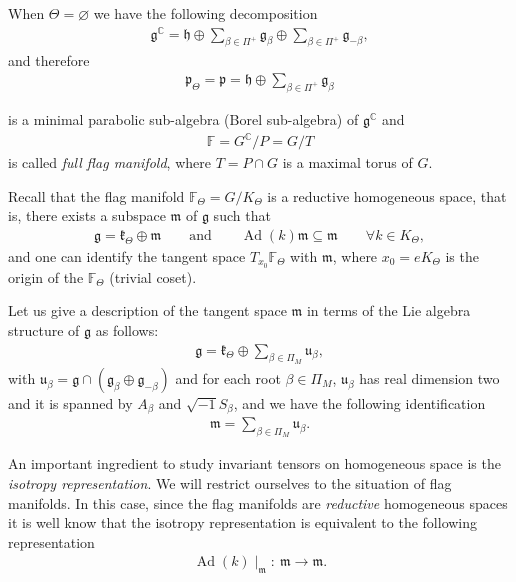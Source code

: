 \documentclass[10pt,a4paper]{amsart}
\numberwithin{equation}{section}
\DeclareMathOperator{\Ad}{Ad}
\begin{document}
When $\Theta=\varnothing$ we have the following decomposition
\begin{gather*}
\mathfrak{g}^\mathbb{C}=\mathfrak{h}\oplus
\sum_{\beta\in \Pi^{+}}\mathfrak{g}_{\beta}\oplus
\sum_{\beta\in \Pi^{+}}\mathfrak{g}_{-\beta},
\end{gather*}
and therefore
\begin{gather*}
\mathfrak{p}_{\Theta}=\mathfrak{p}=\mathfrak{h}\oplus
\sum_{\beta\in \Pi^{+}}\mathfrak{g}_{\beta}
\end{gather*}
{\samepage
is a minimal parabolic sub-algebra (Borel sub-algebra) of $\mathfrak{g}^\mathbb{C}$ and
\begin{gather*}
\mathbb{F}=G^\mathbb{C}/P=G/T
\end{gather*}
is called {\it full flag manifold}, where $T=P\cap G$ is a maximal torus of $G$.

}

Recall that the flag manifold $\mathbb{F}_{\Theta}=G/K_{\Theta}$ is a reductive homogeneous space, that is, there exists a subspace $\mathfrak{m}$ of $\mathfrak{g}$ such that
\begin{gather*}
\mathfrak{g}=\mathfrak{k}_{\Theta}\oplus \mathfrak{m} \qquad \text{and} \qquad
\Ad(k)\mathfrak{m}\subseteq \mathfrak{m}\qquad \forall k\in K_{\Theta},
\end{gather*}
and one can identify the tangent space $T_{x_{0}}\mathbb{F}_{\Theta}$ with $\mathfrak{m}$, where $x_{0}=eK_{\Theta}$ is the origin of the $\mathbb{F}_{\Theta}$ (trivial coset).

Let us give a description of the tangent space $\mathfrak{m}$ in terms of the Lie algebra structure of $\mathfrak{g}$ as follows:
\begin{gather*}
\mathfrak{g}=\mathfrak{k}_{\Theta}\oplus\sum_{\beta\in \Pi_{M}}{\mathfrak{u}_{\beta}},
\end{gather*}
with $\mathfrak{u}_{\beta}=\mathfrak{g}\cap(\mathfrak{g}_{\beta}\oplus \mathfrak{g}_{-\beta})$ and for each root $\beta \in \Pi_{M}$, $\mathfrak{u}_{\beta}$ has real dimension two and it is spanned by $A_{\beta}$ and $\sqrt{-1}S_{\beta}$, and we have the following identification
\begin{gather*}
\mathfrak{m}=\sum_{\beta\in \Pi_{M}}\mathfrak{u}_{\beta}.
\end{gather*}

An important ingredient to study invariant tensors on homogeneous space is the {\em isotropy representation}. We will restrict ourselves to the situation of flag manifolds. In this case, since the flag manifolds are {\em reductive} homogeneous spaces it is well know that the isotropy representation is equivalent to the following representation
\begin{gather*}
\Ad(k)\mid_{\mathfrak{m}}\colon\ \mathfrak{m}\longrightarrow\mathfrak{m}.
\end{gather*}
\end{document}
